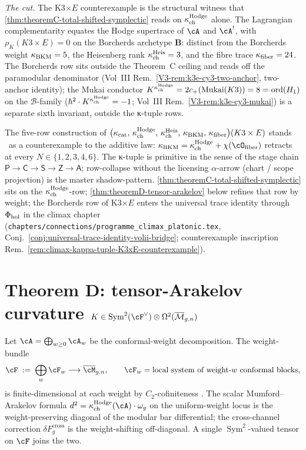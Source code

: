 \begin{remark}
\emph{The cut.} The K3$\times E$ counterexample is the structural
witness that \cref{thm:theoremC-total-shifted-symplectic} reads on
$\kappa_{\mathrm{ch}}^{\mathrm{Hodge}}$ alone. The Lagrangian complementarity equates the
Hodge supertrace of $\cA$ and $\cA^!$, with
$\rho_K(K3 \times E) = 0$ on the Borcherds archetype
$\mathbf{B}$: distinct from the Borcherds weight
$\kappa_{\mathrm{BKM}} = 5$, the Heisenberg rank $\kappa_{\mathrm{ch}}^{\mathrm{Heis}} = 3$, and the
fibre trace $\kappa_{\mathrm{fiber}} = 24$. The Borcherds row sits outside the
Theorem~C ceiling and reads off the paramodular denominator
(Vol~III Rem.~\ref*{V3-rem:k3e-cy3-two-anchor}, two-anchor
identity); the Mukai conductor
$K^{\kappa_{\mathrm{ch}}^{\mathrm{Hodge}}} = 2 c_+(\mathrm{Mukai}(K3)) = 8 = \mathrm{ord}(H_1)$ on
the $\mathcal B$-family ($\hbar^2 \cdot K^{\kappa_{\mathrm{ch}}^{\mathrm{Hodge}}} = -1$;
Vol~III Rem.~\ref*{V3-rem:k3e-cy3-mukai}) is a separate sixth
invariant, outside the κ-tuple rows.

The five-row construction of $\bigl(\kappa_{\mathrm{cat}},\, \kappa_{\mathrm{ch}}^{\mathrm{Hodge}},\, \kappa_{\mathrm{ch}}^{\mathrm{Heis}},\, \kappa_{\mathrm{BKM}},\, \kappa_{\mathrm{fiber}}\bigr)(K3 \times E)$ stands
\ClaimStatusProvedHere\ as a counterexample to the additive law:
$\kappaBKM = \kappaChHodge + \chi(\cO_{\mathrm{fiber}})$ retracts
at every $N \in \{1, 2, 3, 4, 6\}$. The κ-tuple is primitive in
the sense of the stage chain
$\mathsf{P} \to \mathsf{C} \to \mathsf{S} \to \mathsf{Z} \to
\mathsf{A}$; row-collapse without the licensing $\alpha$-arrow
(chart / scope projection) is the master shadow-pattern.
\cref{thm:theoremC-total-shifted-symplectic} sits on the
$\kappa_{\mathrm{ch}}^{\mathrm{Hodge}}$-row;
\cref{thm:theoremD-tensor-arakelov} below refines that row by
weight; the Borcherds row of K3$\times E$ enters the universal
trace identity through $\Phi_{\mathrm{hol}}$ in the climax chapter
(\texttt{chapters/connections/programme\_climax\_platonic.tex},
Conj.~\ref*{conj:universal-trace-identity-volii-bridge}; counterexample
inscription
Rem.~\ref*{rem:climax-kappa-tuple-K3xE-counterexample}).
\end{remark}

\section{Theorem D: tensor-Arakelov curvature $K \in \mathrm{Sym}^2(\cF^\vee) \otimes \Omega^2(\overline{\mathcal{M}}_{g,n})$}
\label{sec:theoremD-tensor-arakelov-native}

Let $\cA = \bigoplus_{w \ge 0} \cA_w$ be the conformal-weight
decomposition. The weight-bundle
\[
 \cF \;:=\; \bigoplus_w \cF_w \longrightarrow \overline{\cM}_{g,n},
 \qquad
 \cF_w = \text{local system of weight-$w$ conformal blocks},
\]
is finite-dimensional at each weight by $C_2$-cofiniteness
\cite{Arakawa2012C2}. The scalar Mumford--Arakelov formula
$d^2 = \kappaChHodge(\cA) \cdot \omega_g$ on the uniform-weight
locus is the weight-preserving diagonal of the modular bar
differential; the cross-channel correction
$\delta F_g^{\mathrm{cross}}$ is the weight-shifting off-diagonal.
A single $\operatorname{Sym}^2$-valued tensor on $\cF$ joins the
two.

